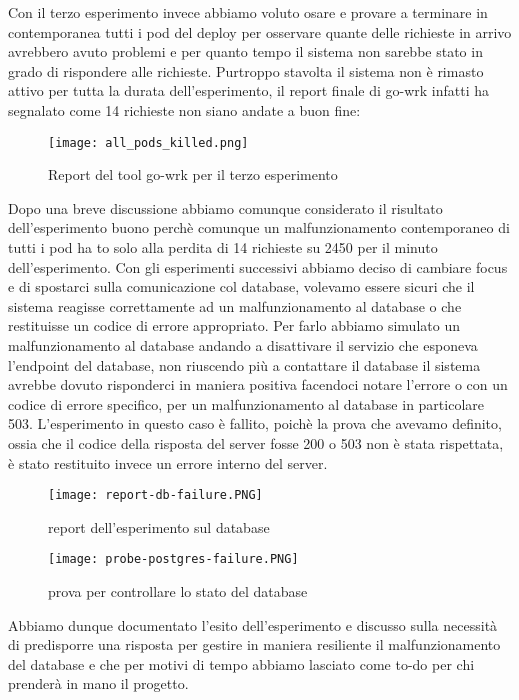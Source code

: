 Con il terzo esperimento invece abbiamo voluto osare e provare a terminare in contemporanea tutti i pod del deploy per osservare quante delle richieste in arrivo avrebbero avuto problemi e per quanto tempo il sistema non sarebbe stato in grado di rispondere alle richieste.
Purtroppo stavolta il sistema non è rimasto attivo per tutta la durata dell'esperimento, il report finale di go-wrk infatti ha segnalato come 14 richieste non siano andate a buon fine:
\begin{figure}[]
    \centering
    \texttt{[image: all\_pods\_killed.png]}
    \caption{Report del tool go-wrk per il terzo esperimento}
    \label{tab:report-all-pods-killed}
\end{figure}
Dopo una breve discussione abbiamo comunque considerato il risultato dell'esperimento buono perchè comunque un malfunzionamento contemporaneo di tutti i pod ha to solo alla perdita di 14 richieste su 2450 per il minuto dell'esperimento.
Con gli esperimenti successivi abbiamo deciso di cambiare focus e di spostarci sulla comunicazione col database, volevamo essere sicuri che il sistema reagisse correttamente ad un malfunzionamento al database o che restituisse un codice di errore appropriato.
Per farlo abbiamo simulato un malfunzionamento al database andando a disattivare il servizio che esponeva l'endpoint del database, non riuscendo più a contattare il database il sistema avrebbe dovuto risponderci in maniera positiva facendoci notare l'errore o con un codice di errore specifico, per un malfunzionamento al database in particolare 503.
L'esperimento in questo caso è fallito, poichè la prova che avevamo definito, ossia che il codice della risposta del server fosse 200 o 503 non è stata rispettata, è stato restituito invece un errore interno del server.
\begin{figure}[]
    \centering
    \texttt{[image: report-db-failure.PNG]}
    \caption{report dell'esperimento sul database}
    \label{tab:report-database-experiment}
\end{figure}
\begin{figure}[]
    \centering
    \texttt{[image: probe-postgres-failure.PNG]}
    \caption{prova per controllare lo stato del database}
    \label{tab:report-database-experiment}
\end{figure}
Abbiamo dunque documentato l'esito dell'esperimento e discusso sulla necessità di predisporre una risposta per gestire in maniera resiliente il malfunzionamento del database e che per motivi di tempo abbiamo lasciato come to-do per chi prenderà in mano il progetto.
